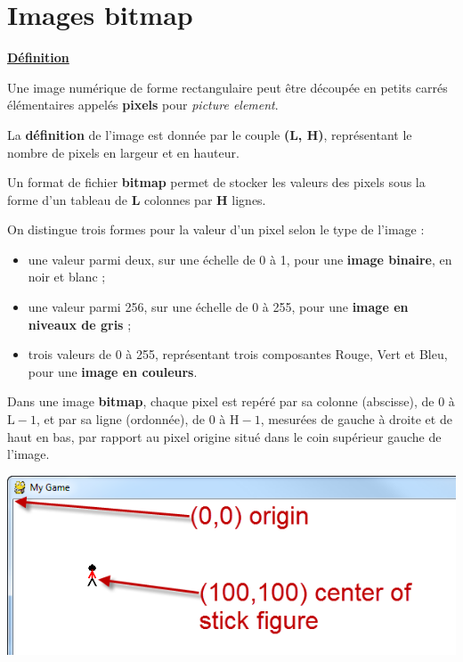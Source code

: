 \documentclass[a4paper, french, 12pt]{article}  %
\newcounter{def}
\newenvironment{definition}
{\par \medskip   \begin{leftbar} \noindent \addtocounter{def}{1}\underline{\textbf{Définition} \textbf{\thedef}}  \vspace*{10pt} \par  }
{\end{leftbar}  \par \medskip }
\begin{document}
\setlength{\parindent}{0cm}

\section{Images bitmap}


\begin{definition}{}
Une image numérique de forme rectangulaire peut être découpée en petits carrés élémentaires appelés \textbf{pixels} pour \textit{picture element}.

La \textbf{définition} de l'image est donnée par le couple \textbf{(L, H)}, représentant le nombre de pixels en largeur et en hauteur.

Un format de fichier \textbf{bitmap} permet de stocker les valeurs des pixels sous la forme d'un tableau de  \textbf{L} colonnes par \textbf{H} lignes.

On distingue trois formes pour la valeur d'un pixel selon le type de l'image :

\begin{itemize}
	\item une valeur parmi deux, sur une échelle de   0  à 1,  pour une \textbf{image binaire}, en noir et blanc ; 
	\item une valeur parmi 256, sur une échelle  de 0 à 255, pour une \textbf{image en niveaux de gris} ; 
	\item trois valeurs de 0 à 255, représentant trois composantes Rouge, Vert et Bleu, pour une \textbf{image en couleurs}.
\end{itemize}


\begin{minipage}{0.45\linewidth}
Dans une image \textbf{bitmap}, chaque pixel est repéré  par sa colonne (abscisse), de 0 à  $\text{L} - 1$,  et  par sa ligne (ordonnée), de 0 à $\text{H} - 1$, mesurées de gauche à droite et de haut en bas, par rapport au pixel origine situé dans le coin supérieur gauche de l'image.
\end{minipage}\hfill
\begin{minipage}{0.45\linewidth}
\begin{center}
\includegraphics[scale=0.5]{ressources/positionnement.png}
\end{center}
\end{minipage}


\end{definition}
\end{document}
